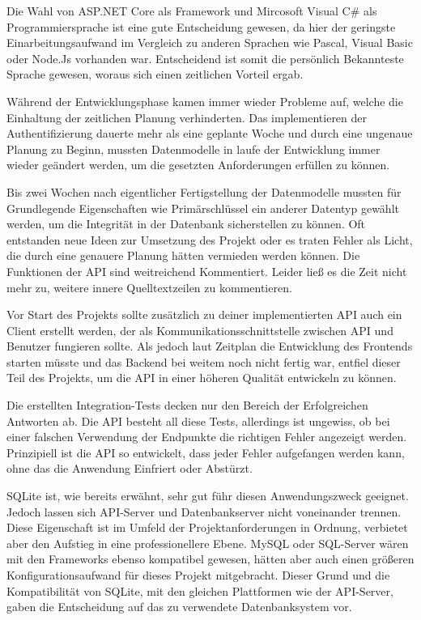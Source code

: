 Die Wahl von ASP.NET Core als Framework und Mircosoft Visual C\# als Programmiersprache ist eine gute Entscheidung gewesen, da hier der geringste Einarbeitungsaufwand im Vergleich zu anderen Sprachen wie Pascal, Visual Basic oder Node.Js vorhanden war. Entscheidend ist somit die persönlich Bekannteste Sprache gewesen, woraus sich einen zeitlichen Vorteil ergab.

Während der Entwicklungsphase kamen immer wieder Probleme auf, welche die Einhaltung der zeitlichen Planung verhinderten.
Das implementieren der Authentifizierung dauerte mehr als eine geplante Woche und durch eine ungenaue Planung zu Beginn, mussten Datenmodelle in laufe der Entwicklung immer wieder geändert werden, um die gesetzten Anforderungen erfüllen zu können.

Bis zwei Wochen nach eigentlicher Fertigstellung der Datenmodelle mussten für Grundlegende Eigenschaften wie Primärschlüssel ein anderer Datentyp gewählt werden, um die Integrität in der Datenbank sicherstellen zu können.
Oft entstanden neue Ideen zur Umsetzung des Projekt oder es traten Fehler als Licht, die durch eine genauere Planung hätten vermieden werden können.
Die Funktionen der API sind weitreichend Kommentiert. Leider ließ es die Zeit nicht mehr zu, weitere innere Quelltextzeilen zu kommentieren.

Vor Start des Projekts sollte zusätzlich zu deiner implementierten API auch ein Client erstellt werden, der als Kommunikationsschnittstelle zwischen API und Benutzer fungieren sollte. Als jedoch laut Zeitplan die Entwicklung des Frontends starten müsste und das Backend bei weitem noch nicht fertig war, entfiel dieser Teil des Projekts, um die API in einer höheren Qualität entwickeln zu können.

Die erstellten Integration-Tests decken nur den Bereich der Erfolgreichen Antworten ab.
Die API besteht all diese Tests, allerdings ist ungewiss, ob bei einer falschen Verwendung der Endpunkte die richtigen Fehler angezeigt werden.
Prinzipiell ist die API so entwickelt, dass jeder Fehler aufgefangen werden kann, ohne das die Anwendung Einfriert oder Abstürzt.

SQLite ist, wie bereits erwähnt, sehr gut führ diesen Anwendungszweck geeignet.
Jedoch lassen sich API-Server und Datenbankserver nicht voneinander trennen.
Diese Eigenschaft ist im Umfeld der Projektanforderungen in Ordnung, verbietet aber den Aufstieg in eine professionellere Ebene.
MySQL oder SQL-Server wären mit den Frameworks ebenso kompatibel gewesen, hätten aber auch einen größeren Konfigurationsaufwand für dieses Projekt mitgebracht. Dieser Grund und die Kompatibilität von SQLite, mit den gleichen Plattformen wie der API-Server, gaben die Entscheidung auf das zu verwendete Datenbanksystem vor.

